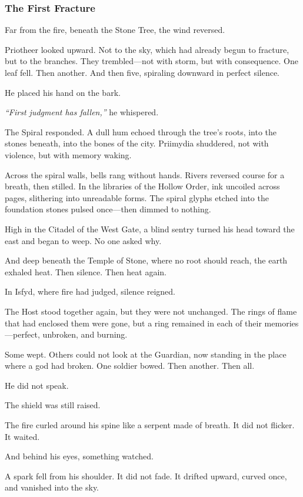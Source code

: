 \documentclass[12pt]{article}
\begin{document}
\dotfill

\subsubsection*{The First Fracture}

Far from the fire, beneath the Stone Tree, the wind reversed.

Priotheer looked upward. Not to the sky, which had already begun to fracture, but to the branches. They trembled—not with storm, but with consequence. One leaf fell. Then another. And then five, spiraling downward in perfect silence.

He placed his hand on the bark.

\textit{``First judgment has fallen,''} he whispered.

The Spiral responded. A dull hum echoed through the tree's roots, into the stones beneath, into the bones of the city. Priimydia shuddered, not with violence, but with memory waking.

Across the spiral walls, bells rang without hands. Rivers reversed course for a breath, then stilled. In the libraries of the Hollow Order, ink uncoiled across pages, slithering into unreadable forms. The spiral glyphs etched into the foundation stones pulsed once—then dimmed to nothing.

High in the Citadel of the West Gate, a blind sentry turned his head toward the east and began to weep. No one asked why.

And deep beneath the Temple of Stone, where no root should reach, the earth exhaled heat. Then silence. Then heat again.

In Isfyd, where fire had judged, silence reigned.

The Host stood together again, but they were not unchanged. The rings of flame that had enclosed them were gone, but a ring remained in each of their memories—perfect, unbroken, and burning.

Some wept. Others could not look at the Guardian, now standing in the place where a god had broken. One soldier bowed. Then another. Then all.

He did not speak.

The shield was still raised.

The fire curled around his spine like a serpent made of breath. It did not flicker. It waited.

And behind his eyes, something watched.

A spark fell from his shoulder. It did not fade. It drifted upward, curved once, and vanished into the sky.
\end{document}
